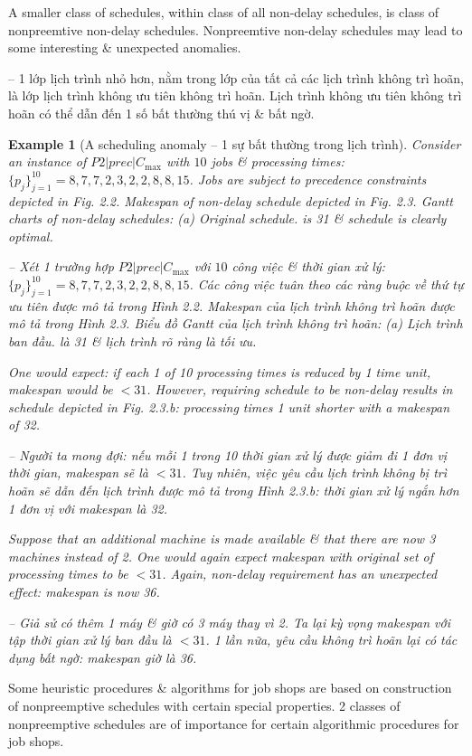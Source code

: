 \documentclass{article}
\newtheorem{example}{Example}
\begin{document}
\begin{itemize}
\begin{itemize}
        A smaller class of schedules, within class of all non-delay schedules, is class of nonpreemtive non-delay schedules. Nonpreemtive non-delay schedules may lead to some interesting \& unexpected anomalies.

        -- 1 lớp lịch trình nhỏ hơn, nằm trong lớp của tất cả các lịch trình không trì hoãn, là lớp lịch trình không ưu tiên không trì hoãn. Lịch trình không ưu tiên không trì hoãn có thể dẫn đến 1 số bất thường thú vị \& bất ngờ.

        \begin{example}[A scheduling anomaly -- 1 sự bất thường trong lịch trình]
            Consider an instance of $P2|prec|C_{\max}$ with $10$ jobs \& processing times: $\{p_j\}_{j=1}^{10} = 8,7,7,2,3,2,2,8,8,15$. Jobs are subject to precedence constraints depicted in Fig. 2.2. Makespan of non-delay schedule depicted in {\sf Fig. 2.3. Gantt charts of non-delay schedules: (a) Original schedule.} is 31 \& schedule is clearly optimal.

            -- Xét 1 trường hợp $P2|prec|C_{\max}$ với $10$ công việc \& thời gian xử lý: $\{p_j\}_{j=1}^{10} = 8,7,7,2,3,2,2,8,8,15$. Các công việc tuân theo các ràng buộc về thứ tự ưu tiên được mô tả trong Hình 2.2. Makespan của lịch trình không trì hoãn được mô tả trong {\sf Hình 2.3. Biểu đồ Gantt của lịch trình không trì hoãn: (a) Lịch trình ban đầu.} là 31 \& lịch trình rõ ràng là tối ưu.

            One would expect: if each 1 of 10 processing times is reduced by 1 time unit, makespan would be $< 31$. However, requiring schedule to be non-delay results in schedule depicted in {\sf Fig. 2.3.b: processing times 1 unit shorter} with a makespan of 32.

            -- Người ta mong đợi: nếu mỗi 1 trong 10 thời gian xử lý được giảm đi 1 đơn vị thời gian, makespan sẽ là $< 31$. Tuy nhiên, việc yêu cầu lịch trình không bị trì hoãn sẽ dẫn đến lịch trình được mô tả trong {\sf Hình 2.3.b: thời gian xử lý ngắn hơn 1 đơn vị} với makespan là 32.

            Suppose that an additional machine is made available \& that there are now 3 machines instead of 2. One would again expect makespan with original set of processing times to be $< 31$. Again, non-delay requirement has an unexpected effect: makespan is now 36.

            -- Giả sử có thêm 1 máy \& giờ có 3 máy thay vì 2. Ta lại kỳ vọng makespan với tập thời gian xử lý ban đầu là $< 31$. 1 lần nữa, yêu cầu không trì hoãn lại có tác dụng bất ngờ: makespan giờ là 36.
        \end{example}
        Some heuristic procedures \& algorithms for job shops are based on construction of nonpreemptive schedules with certain special properties. 2 classes of nonpreemptive schedules are of importance for certain algorithmic procedures for job shops.


\end{itemize}
\end{itemize}
\end{document}
